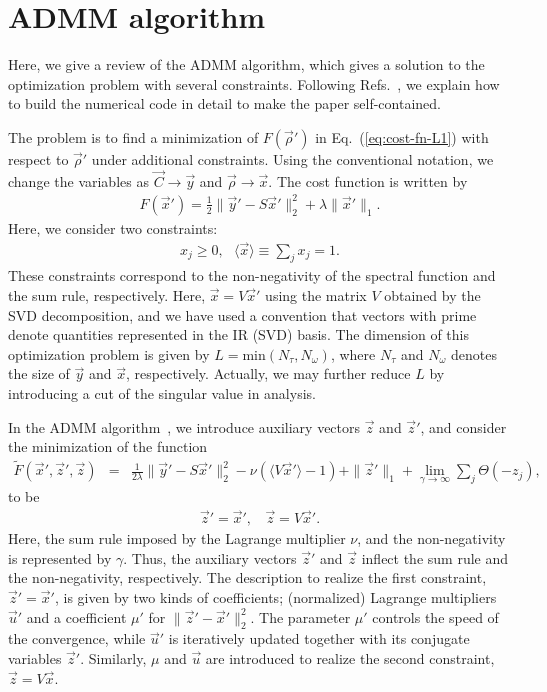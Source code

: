 \documentclass[a4paper,11pt]{article}
\newcommand\beq{ \begin{eqnarray} }
\newcommand\eeq{ \end{eqnarray} }
\begin{document}
\appendix
\section{ADMM algorithm}\label{sec:ADMM}
Here, we give a review of the ADMM algorithm, which gives a solution to the optimization problem with several constraints.
Following Refs.~\cite{Shinaoka2017b, ADMM1, ADMM2}, we explain how to build the numerical code in detail to make the paper self-contained.


The problem is to find a minimization of $F(\vec{\rho}')$ in Eq.~(\ref{eq:cost-fn-L1}) with respect to $\vec{\rho}'$ under additional constraints.
Using the conventional notation, we change the variables as $\vec{C} \rightarrow \vec{y}$ and $\vec{\rho} \rightarrow \vec{x}$.
The cost function is written by
\beq
F(\vec{x}') = \frac{1}{2} \| \vec{y}' - S \vec{x}'  \|^2_2 + \lambda \| \vec{x}' \|_1.
\eeq
Here, we consider two constraints:
\beq
x_j \ge 0, ~~~ \langle \vec{x} \rangle \equiv \sum_j x_j = 1.
\eeq
These constraints correspond to the non-negativity of the spectral function and the sum rule, respectively.
Here, $\vec{x} = V \vec{x}'$ using the matrix $V$ obtained by the SVD decomposition, and we have used a convention that vectors with prime denote quantities represented in the IR (SVD) basis.
The dimension of this optimization problem is given by $L = \mbox{min} (N_\tau, N_\omega)$, where $N_\tau$ and $N_\omega$ denotes the size of $\vec{y}$ and $\vec{x}$, respectively.
Actually, we may further reduce $L$ by introducing a cut of the singular value in analysis.


In the ADMM algorithm~\cite{ADMM1, ADMM2}, we introduce auxiliary vectors $\vec{z}$ and $\vec{z}'$, and consider  the minimization of the function
\beq
\tilde{F} (\vec{x}',\vec{z}',\vec{z}) &=& \frac{1}{2\lambda} \| \vec{y}' - S \vec{x}'  \|^2_2 - \nu ( \langle  V \vec{x}' \rangle -1 ) 
+\| \vec{z}' \|_1 + \lim_{\gamma \rightarrow \infty} \sum_j \Theta (-z_j),\label{eq:App-cost}
\eeq
to be
\beq
\vec{z}' = \vec{x}', ~~~~\vec{z} = V \vec{x}'.
\eeq
Here, the sum rule imposed by the Lagrange multiplier $\nu$, and the non-negativity is represented by $\gamma$.
Thus, the auxiliary vectors $\vec{z}'$ and $\vec{z}$ inflect the sum rule and the non-negativity, respectively.
The description to realize the first constraint, $\vec{z}' = \vec{x}'$, is given by two kinds of coefficients; (normalized) Lagrange multipliers $\vec{u}'$ and a coefficient $\mu'$ for $\| \vec{z}' - \vec{x}' \|^2_2$.
The parameter $\mu'$ controls the speed of the convergence, while $\vec{u}'$ is iteratively updated together with its conjugate variables $\vec{z}'$.
Similarly, $\mu$ and $\vec{u}$ are introduced to realize the second constraint, $\vec{z}=V \vec{x}$.
\end{document}
